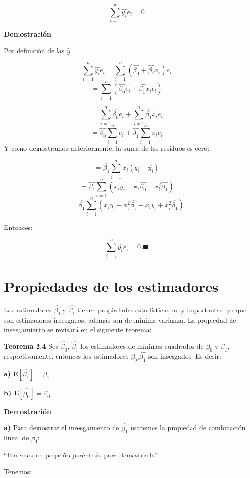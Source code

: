 \documentclass[
  a4paper,
  oneside,
  openany]{book}
\begin{document}
\[\sum_{i=1}^{n}\hat{y_{i}}e_{i}=0\]

\textbf{Demostración}

Por definición de las \(\hat{y}\)

\[\sum_{i=1}^{n}\hat{y_{i}}e_{i}=\sum_{i=1}^{n}(\hat{\beta_{0}}+\hat{\beta_{1}}x_{i})e_{i}\]
\[=\sum_{i=1}^{n}\left(\hat{\beta_{0}}e_{i}+\hat{\beta_{1}}x_{i}e_{i}\right)\]

\[=\sum_{i=1}^{n}\hat{\beta_{0}}e_{i}+\sum_{i=1}^{n}\hat{\beta_{1}}x_{i}e_{i}\]
\[=\hat{\beta_{0}}\sum_{i=1}^{n}e_{i}+\hat{\beta_{1}}\sum_{i=1}^{n}x_{i}e_{i}\]
Y como demostramos anteriormente, la suma de los residuos es cero:

\[=\hat{\beta_{1}}\sum_{i=1}^{n}x_{i}(y_{i}-\hat{y_{i}})\]
\[=\hat{\beta_{1}}\sum_{i=1}^{n}\left(x_{i}y_{i}-x_{i}\hat{\beta_{0}}-x_{i}^{2}\hat{\beta_{1}}\right)\]
\[=\hat{\beta_{1}}\sum_{i=1}^{n}\left(x_{i}y_{i}-x_{i}^2\hat{\beta_{1}}-x_{i}y_{i}+x_{i}^{2}\hat{\beta_{1}}\right)\]

Entonces:

\[\sum_{i=1}^{n}\hat{y_{i}}e_{i}=0. \blacksquare\]

\hypertarget{propiedades-de-los-estimadores}{%
\section{Propiedades de los estimadores}\label{propiedades-de-los-estimadores}}

Los estimadores \(\hat{\beta_{0}}\) y \(\hat{\beta_{1}}\) tienen propiedades estadísticas muy importantes. ya que son estimadores insesgados, además son de mínima varianza. La propiedad de insesgamiento se revisará en el siguiente teorema:

\textbf{Teorema 2.4} Sea \(\hat{\beta_{0}}\), \(\hat{\beta_{1}}\) los estimadores de mínimos cuadrados de \(\beta_{0}\) y \(\beta_{1}\), respectivamente, entonces los estimadores \(\hat{\beta_{0}}\),\(\hat{\beta_{1}}\) son insesgados. Es decir:

\textbf{a)} \(\mathbf{E}\left[\hat{\beta_{1}}\right]=\beta_{1}\)

\textbf{b)} \(\mathbf{E}\left[\hat{\beta_{0}}\right]=\beta_{0}\)

\textbf{Demostración}

\textbf{a)} Para demostrar el insesgamiento de \(\hat{\beta_{1}}\) usaremos la propiedad de combinación lineal de \(\beta_{1}:\)

``Haremos un pequeño paréntesis para demostrarlo''

Tenemos:
\end{document}
